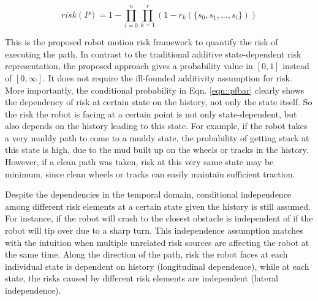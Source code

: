 \documentclass[letterpaper]{article} %
\begin{document}
\begin{equation}
risk(P) = 1 - \prod_{i=0}^{n} \prod_{k=1}^{r} (1-r_k(\{s_0, s_1, ..., s_i\}))
\label{eqn::risk_representation}
\end{equation}

This is the proposed robot motion risk framework to quantify the risk of executing the path. In contrast to the traditional additive state-dependent risk representation, the proposed approach gives a probability value in $[0, 1]$ instead of $[0, \infty]$. It does not require the ill-founded additivity assumption for risk. More importantly, the conditional probability in Eqn. \ref{eqn::pfbar} clearly shows the dependency of risk at certain state on the history, not only the state itself. So the risk the robot is facing at a certain point is not only state-dependent, but also depends on the history leading to this state. For example, if the robot takes a very muddy path to come to a muddy state, the probability of getting stuck at this state is high, due to the mud built up on the wheels or tracks in the history. However, if a clean path was taken, risk at this very same state may be minimum, since clean wheels or tracks can easily maintain sufficient traction. 

Despite the dependencies in the temporal domain, conditional independence among different risk elements at a certain state given the history is still assumed. For instance, if the robot will crash to the closest obstacle is independent of if the robot will tip over due to a sharp turn. This independence assumption matches with the intuition when multiple unrelated risk sources are affecting the robot at the same time. Along the direction of the path, risk the robot faces at each individual state is dependent on history (longitudinal dependence), while at each state, the risks caused by different risk elements are independent (lateral independence). 

\end{document}
